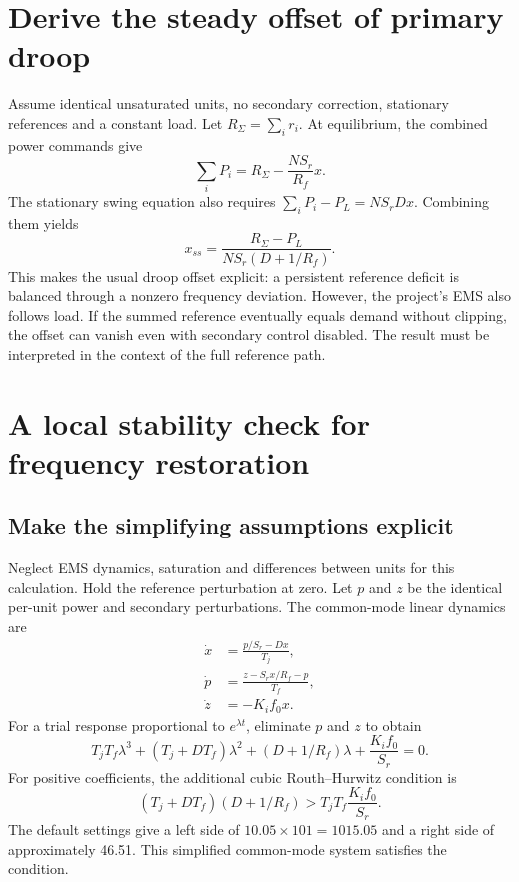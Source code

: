 \documentclass[11pt,a4paper]{article}
\begin{document}
\section{Derive the steady offset of primary droop}
Assume identical unsaturated units, no secondary correction, stationary references and a constant load. Let $R_\Sigma=\sum_i r_i$. At equilibrium, the combined power commands give
\begin{equation}
\sum_iP_i=R_\Sigma-\frac{NS_r}{R_f}x.
\end{equation}
The stationary swing equation also requires $\sum_iP_i-P_L=NS_rDx$. Combining them yields
\begin{equation}
x_{ss}=\frac{R_\Sigma-P_L}{NS_r(D+1/R_f)}.
\end{equation}
This makes the usual droop offset explicit: a persistent reference deficit is balanced through a nonzero frequency deviation. However, the project's EMS also follows load. If the summed reference eventually equals demand without clipping, the offset can vanish even with secondary control disabled. The result must be interpreted in the context of the full reference path.

\section{A local stability check for frequency restoration}
\subsection{Make the simplifying assumptions explicit}
Neglect EMS dynamics, saturation and differences between units for this calculation. Hold the reference perturbation at zero. Let $p$ and $z$ be the identical per-unit power and secondary perturbations. The common-mode linear dynamics are
\begin{align}
\dot x&=\frac{p/S_r-Dx}{T_j},\\
\dot p&=\frac{z-S_rx/R_f-p}{T_f},\\
\dot z&=-K_if_0x.
\end{align}
For a trial response proportional to $e^{\lambda t}$, eliminate $p$ and $z$ to obtain
\begin{equation}
T_jT_f\lambda^3+(T_j+DT_f)\lambda^2
+(D+1/R_f)\lambda+\frac{K_if_0}{S_r}=0.
\end{equation}
For positive coefficients, the additional cubic Routh--Hurwitz condition is
\begin{equation}
(T_j+DT_f)(D+1/R_f)>T_jT_f\frac{K_if_0}{S_r}.
\end{equation}
The default settings give a left side of $10.05\times101=1015.05$ and a right side of approximately 46.51. This simplified common-mode system satisfies the condition.
\end{document}
